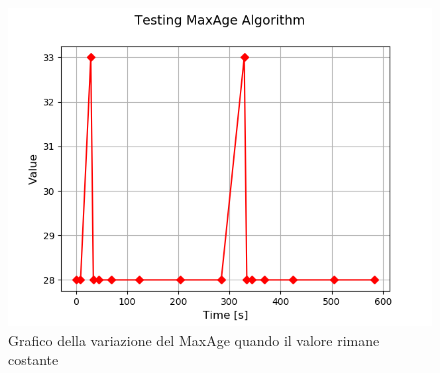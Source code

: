       \begin{figure}
        \centering
        \includegraphics[scale=0.75]{../Immagini/MaxAge.png}
        \caption{Grafico della variazione del MaxAge quando il valore rimane costante}
        \label{fig:graficoMaxAge}
      \end{figure}
